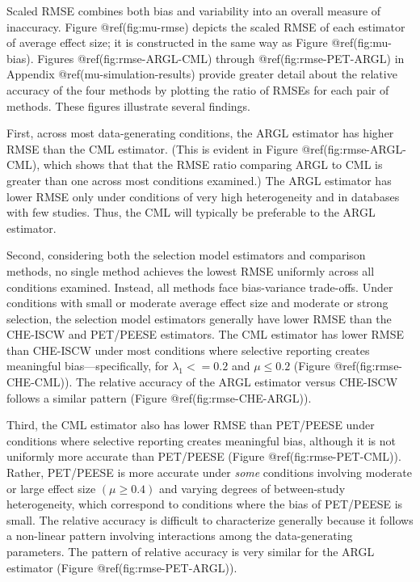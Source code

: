 \documentclass[
]{article}
\begin{document}
Scaled RMSE combines both bias and variability into an overall measure
of inaccuracy. Figure @ref(fig:mu-rmse) depicts the scaled RMSE of each
estimator of average effect size; it is constructed in the same way as
Figure @ref(fig:mu-bias). Figures @ref(fig:rmse-ARGL-CML) through
@ref(fig:rmse-PET-ARGL) in Appendix @ref(mu-simulation-results) provide
greater detail about the relative accuracy of the four methods by
plotting the ratio of RMSEs for each pair of methods. These figures
illustrate several findings.

First, across most data-generating conditions, the ARGL estimator has
higher RMSE than the CML estimator. (This is evident in Figure
@ref(fig:rmse-ARGL-CML), which shows that that the RMSE ratio comparing
ARGL to CML is greater than one across most conditions examined.) The
ARGL estimator has lower RMSE only under conditions of very high
heterogeneity and in databases with few studies. Thus, the CML will
typically be preferable to the ARGL estimator.

Second, considering both the selection model estimators and comparison
methods, no single method achieves the lowest RMSE uniformly across all
conditions examined. Instead, all methods face bias-variance trade-offs.
Under conditions with small or moderate average effect size and moderate
or strong selection, the selection model estimators generally have lower
RMSE than the CHE-ISCW and PET/PEESE estimators. The CML estimator has
lower RMSE than CHE-ISCW under most conditions where selective reporting
creates meaningful bias---specifically, for \(\lambda_1 <= 0.2\) and
\(\mu \leq 0.2\) (Figure @ref(fig:rmse-CHE-CML)). The relative accuracy
of the ARGL estimator versus CHE-ISCW follows a similar pattern (Figure
@ref(fig:rmse-CHE-ARGL)).

Third, the CML estimator also has lower RMSE than PET/PEESE under
conditions where selective reporting creates meaningful bias, although
it is not uniformly more accurate than PET/PEESE (Figure
@ref(fig:rmse-PET-CML)). Rather, PET/PEESE is more accurate under
\emph{some} conditions involving moderate or large effect size
\((\mu \geq 0.4)\) and varying degrees of between-study heterogeneity,
which correspond to conditions where the bias of PET/PEESE is small. The
relative accuracy is difficult to characterize generally because it
follows a non-linear pattern involving interactions among the
data-generating parameters. The pattern of relative accuracy is very
similar for the ARGL estimator (Figure @ref(fig:rmse-PET-ARGL)).
\end{document}
